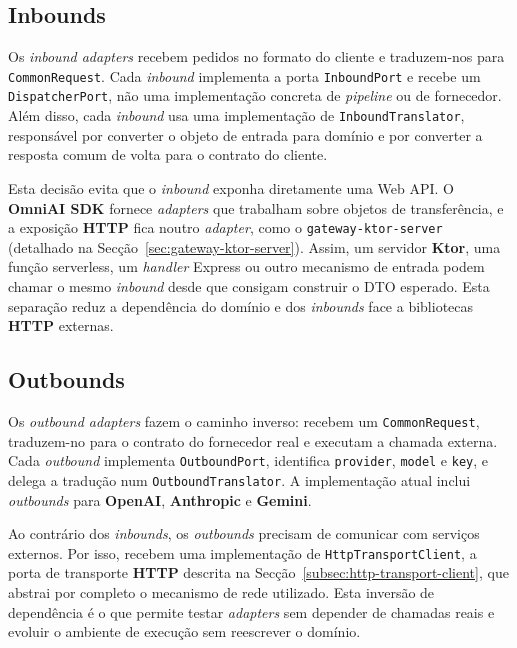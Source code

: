     \subsection{Inbounds}
    Os \textit{inbound adapters} recebem pedidos no formato do cliente e traduzem-nos para \texttt{CommonRequest}. Cada \textit{inbound} implementa a porta \texttt{InboundPort} e recebe um \texttt{DispatcherPort}, não uma implementação concreta de \textit{pipeline} ou de fornecedor. Além disso, cada \textit{inbound} usa uma implementação de \texttt{InboundTranslator}, responsável por converter o objeto de entrada para domínio e por converter a resposta comum de volta para o contrato do cliente.

    Esta decisão evita que o \textit{inbound} exponha diretamente uma Web API. O \textbf{OmniAI SDK} fornece \textit{adapters} que trabalham sobre objetos de transferência, e a exposição \textbf{HTTP} fica noutro \textit{adapter}, como o \texttt{gateway-ktor-server} (detalhado na Secção~\ref{sec:gateway-ktor-server}). Assim, um servidor \textbf{Ktor}, uma função serverless, um \textit{handler} Express ou outro mecanismo de entrada podem chamar o mesmo \textit{inbound} desde que consigam construir o DTO esperado. Esta separação reduz a dependência do domínio e dos \textit{inbounds} face a bibliotecas \textbf{HTTP} externas.

    \subsection{Outbounds}
    Os \textit{outbound adapters} fazem o caminho inverso: recebem um \texttt{CommonRequest}, traduzem-no para o contrato do fornecedor real e executam a chamada externa. Cada \textit{outbound} implementa \texttt{OutboundPort}, identifica \texttt{provider}, \texttt{model} e \texttt{key}, e delega a tradução num \texttt{OutboundTranslator}. A implementação atual inclui \textit{outbounds} para \textbf{OpenAI}, \textbf{Anthropic} e \textbf{Gemini}.

    Ao contrário dos \textit{inbounds}, os \textit{outbounds} precisam de comunicar com serviços externos. Por isso, recebem uma implementação de \texttt{HttpTransportClient}, a porta de transporte \textbf{HTTP} descrita na Secção~\ref{subsec:http-transport-client}, que abstrai por completo o mecanismo de rede utilizado. Esta inversão de dependência é o que permite testar \textit{adapters} sem depender de chamadas reais e evoluir o ambiente de execução sem reescrever o domínio.

